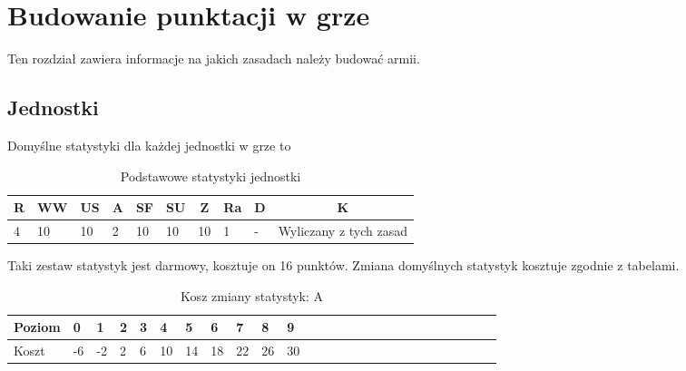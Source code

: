 \chapter{Budowanie punktacji w grze}
Ten rozdział zawiera informacje na jakich zasadach należy budować armii. 

\section{Jednostki}

Domyślne statystyki dla każdej jednostki w grze to 

\begin{table}[h]
\caption{Podstawowe statystyki jednostki}

    \begin{tabular}{|l|l|l|l|l|l|l|l|l|l|}
    \hline
    \multicolumn{1}{c}{R} & \multicolumn{1}{c}{WW} & \multicolumn{1}{c}{US} & \multicolumn{1}{c}{A} & \multicolumn{1}{c}{SF} & \multicolumn{1}{c}{SU} & \multicolumn{1}{c}{Z} & \multicolumn{1}{c}{Ra} & \multicolumn{1}{c}{D} & \multicolumn{1}{c}{K} \\ \hline
    4 & 10 & 10 & 2 & 10 & 10 & 10 & 1 & - & Wyliczany z tych zasad \\ \hline
    \end{tabular}

\end{table}

Taki zestaw statystyk jest darmowy, kosztuje on 16 punktów. 
Zmiana domyślnych statystyk kosztuje zgodnie z tabelami. 
\begin{table}[h]
\caption{Kosz zmiany statystyk: WW, US, SF, SU i Z}
\end{table}

\begin{table}[h]
\caption{Kosz zmiany statystyk: A}
    \begin{tabular}{|l|l|l|l|l|l|l|l|l|l|l|l|l|l|l|l|l|l|l|l|l|l|l|l|l|l|}
    \hline
    Poziom & 0 & 1 & 2 & 3 & 4 & 5 & 6 & 7 & 8 & 9 \\ \hline
    Koszt  & -6 & -2 & 2 & 6 & 10 & 14 & 18 & 22 & 26 & 30 \\ \hline
    \end{tabular}
\end{table}

